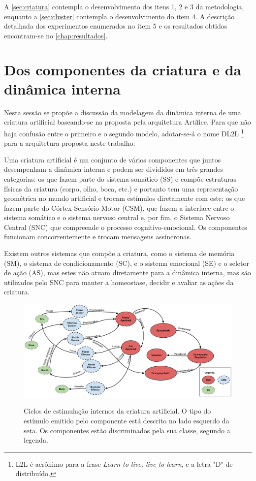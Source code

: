 A \autoref{sec:criatura} contempla o desenvolvimento dos itens 1, 2 e 3 da metodologia, enquanto a \autoref{sec:cluster} contempla o desenvolvimento do item 4. A descrição detalhada dos experimentos enumerados no item 5 e os resultados obtidos encontram-se no \autoref{chap:resultados}.

\section{Dos componentes da criatura e da dinâmica interna}
\label{sec:criatura}

Nesta sessão se propõe a discussão da modelagem da dinâmica interna de uma criatura artificial baseando-se na proposta pela arquitetura Artífice. Para que não haja confusão entre o primeiro e o segundo modelo, adotar-se-á o nome DL2L \footnote{L2L é acrônimo para a frase \textit{Learn to live, live to learn}, e a letra "D" de distribuído.} para a arquitetura proposta neste trabalho.

Uma criatura artificial é um conjunto de vários componentes que juntos desempenham a dinâmica interna e podem ser divididos em três grandes categorias: os que fazem parte do sistema somático (SS) e compõe estruturas físicas da criatura (corpo, olho, boca, etc.) e portanto tem uma representação geométrica no mundo artificial e trocam estímulos diretamente com este; os que fazem parte do Córtex Sensório-Motor (CSM), que fazem a interface entre o sistema somático e o sistema nervoso central e, por fim, o Sistema Nervoso Central (SNC) que compreende o processo cognitivo-emocional. Os componentes funcionam concorrentemente e trocam mensagens assíncronas. 

Existem outros sistemas que compõe a criatura, como o sistema de memória (SM), o sistema de condicionamento (SC), e o sistema emocional (SE) e o seletor de ação (AS), mas estes não atuam diretamente para a dinâmica interna, mas são utilizados pelo SNC para manter a homeostase, decidir e avaliar as ações da criatura. 

\begin{figure}
    \centering
    \caption{Ciclos de estimulação internos da criatura artificial. O tipo do estímulo emitido pelo componente está descrito no lado esquerdo da seta. Os componentes estão discriminados pela sua classe, segundo a legenda.}
    \includegraphics[angle=90,scale=0.5]{./04-figuras/Fig1_CadeiaEstimulos}
    \label{fig:cadeiaEstimulos}
\end{figure}


